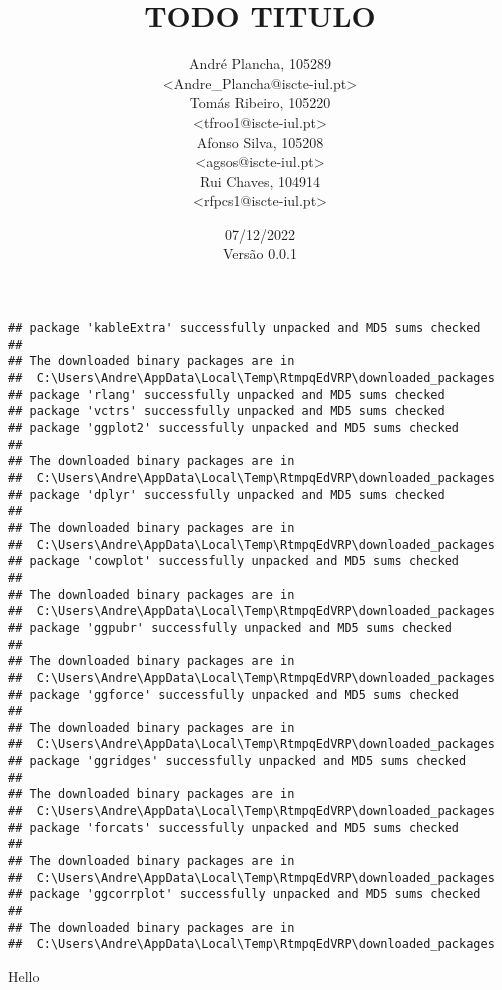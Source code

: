 \documentclass[a4paper, justified]{tufte-handout}\usepackage[]{graphicx}\usepackage[]{xcolor}
\title{TODO TITULO}
\author{
    André Plancha, 105289 \\
    <Andre\_Plancha@iscte-iul.pt> \\
    Tomás Ribeiro, 105220 \\
    <tfroo1@iscte-iul.pt> \\
    Afonso Silva, 105208 \\
    <agsos@iscte-iul.pt> \\
    Rui Chaves, 104914 \\
    <rfpcs1@iscte-iul.pt>
  }
\date{07/12/2022 \\ Versão 0.0.1} %
\makeatletter
\newenvironment{kframe}{%
 \def\at@end@of@kframe{}%
 \ifinner\ifhmode%
  \def\at@end@of@kframe{\end{minipage}}%
  \begin{minipage}{\columnwidth}%
 \fi\fi%
 \def\FrameCommand##1{\hskip\@totalleftmargin \hskip-\fboxsep
 \colorbox{shadecolor}{##1}\hskip-\fboxsep
     \hskip-\linewidth \hskip-\@totalleftmargin \hskip\columnwidth}%
 \MakeFramed {\advance\hsize-\width
   \@totalleftmargin\z@ \linewidth\hsize
   \@setminipage}}%
 {\par\unskip\endMakeFramed%
 \at@end@of@kframe}
\newenvironment{knitrout}{}{} %
\makeatother
\begin{document}
\begin{knitrout}
\color{fgcolor}\begin{kframe}
\begin{verbatim}
## package 'kableExtra' successfully unpacked and MD5 sums checked
## 
## The downloaded binary packages are in
## 	C:\Users\Andre\AppData\Local\Temp\RtmpqEdVRP\downloaded_packages
## package 'rlang' successfully unpacked and MD5 sums checked
## package 'vctrs' successfully unpacked and MD5 sums checked
## package 'ggplot2' successfully unpacked and MD5 sums checked
## 
## The downloaded binary packages are in
## 	C:\Users\Andre\AppData\Local\Temp\RtmpqEdVRP\downloaded_packages
## package 'dplyr' successfully unpacked and MD5 sums checked
## 
## The downloaded binary packages are in
## 	C:\Users\Andre\AppData\Local\Temp\RtmpqEdVRP\downloaded_packages
## package 'cowplot' successfully unpacked and MD5 sums checked
## 
## The downloaded binary packages are in
## 	C:\Users\Andre\AppData\Local\Temp\RtmpqEdVRP\downloaded_packages
## package 'ggpubr' successfully unpacked and MD5 sums checked
## 
## The downloaded binary packages are in
## 	C:\Users\Andre\AppData\Local\Temp\RtmpqEdVRP\downloaded_packages
## package 'ggforce' successfully unpacked and MD5 sums checked
## 
## The downloaded binary packages are in
## 	C:\Users\Andre\AppData\Local\Temp\RtmpqEdVRP\downloaded_packages
## package 'ggridges' successfully unpacked and MD5 sums checked
## 
## The downloaded binary packages are in
## 	C:\Users\Andre\AppData\Local\Temp\RtmpqEdVRP\downloaded_packages
## package 'forcats' successfully unpacked and MD5 sums checked
## 
## The downloaded binary packages are in
## 	C:\Users\Andre\AppData\Local\Temp\RtmpqEdVRP\downloaded_packages
## package 'ggcorrplot' successfully unpacked and MD5 sums checked
## 
## The downloaded binary packages are in
## 	C:\Users\Andre\AppData\Local\Temp\RtmpqEdVRP\downloaded_packages
\end{verbatim}
\end{kframe}
\end{knitrout}

  \cleardoublepage
  {
  \sffamily
  \begin{fullwidth}
  \fontsize{18}{20}\selectfont\par\noindent\textcolor{darkgray}{\allcaps{\thanklessauthor}}%
  \vspace{11.5pc}
  \fontsize{36}{40}\selectfont\par\noindent\textcolor{darkgray}{\allcaps{\thanklesstitle}}%
  \vfill
  \fontsize{14}{16}\selectfont\par\noindent\allcaps{\thanklesspublisher}
  \end{fullwidth}
  }
  \thispagestyle{empty}
  \clearpage
  \vspace*{1cm}
  \begin{fullwidth}
    \Large{
      Hello 
      \lipsum[2]
      \vspace{5cm}
      \lipsum[3]
      \thispagestyle{empty}
    }
    \clearpage
  \end{fullwidth}
  \restoregeometry
\end{document}
